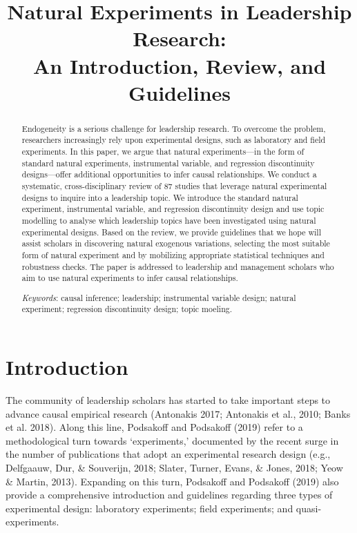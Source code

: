 \documentclass[english]{article}
\title{\LARGE Natural Experiments in Leadership Research:\\
       An Introduction, Review, and Guidelines}
\begin{document}
\begin{singlespace}

\maketitle

\clearpage

\begin{abstract}

Endogeneity is a serious challenge for leadership research. To overcome
the problem, researchers increasingly rely upon experimental designs,
such as laboratory and field experiments. In this paper, we argue that
natural experiments---in the form of standard natural experiments,
instrumental variable, and regression discontinuity designs---offer
additional opportunities to infer causal relationships. We conduct a
systematic, cross-disciplinary review of 87 studies that leverage
natural experimental designs to inquire into a leadership topic. We
introduce the standard natural experiment, instrumental variable, and
regression discontinuity design and use topic modelling to analyse which
leadership topics have been investigated using natural experimental
designs. Based on the review, we provide guidelines that we hope will
assist scholars in discovering natural exogenous variations, selecting
the most suitable form of natural experiment and by mobilizing
appropriate statistical techniques and robustness checks. The paper is
addressed to leadership and management scholars who aim to use natural
experiments to infer causal relationships.

\textit{Keywords}: causal inference; leadership; instrumental variable design;
natural experiment; regression discontinuity design; topic moeling.

\end{abstract}


\end{singlespace}

\clearpage

\section{Introduction}

\noindent The community of leadership scholars has started to take important
steps to advance causal empirical research (Antonakis 2017; Antonakis et al.,
2010; Banks et al. 2018). Along this line, Podsakoff and Podsakoff (2019) refer
to a methodological turn towards `experiments,' documented by the recent surge
in the number of publications that adopt an experimental research design (e.g.,
	Delfgaauw, Dur, \& Souverijn, 2018; Slater, Turner, Evans, \& Jones,
	2018; Yeow \& Martin, 2013). Expanding on this turn, Podsakoff and
	Podsakoff (2019) also provide a comprehensive introduction and
	guidelines regarding three types of experimental design: laboratory
	experiments; field experiments; and quasi-experiments.
\end{document}
